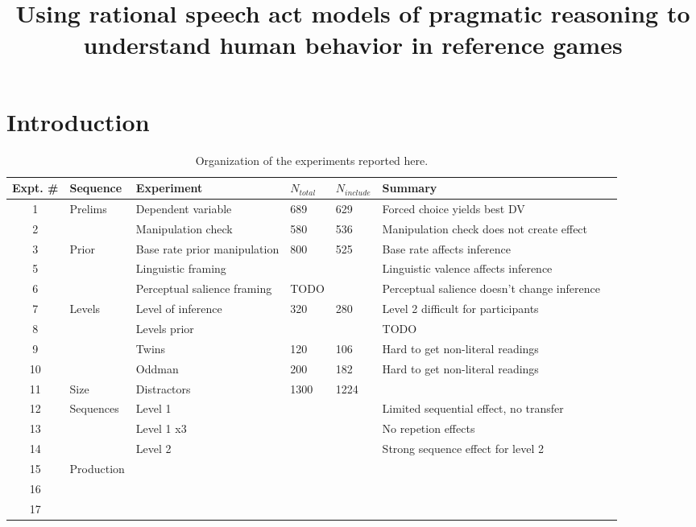 \documentclass[man,noapacite]{apa2}
\title{\vspace{-16ex}Using rational speech act models of pragmatic reasoning to understand human behavior in reference games}
\begin{document}
\maketitle                            


\section{Introduction}







\begin{table}[ht!]
\caption{Organization of the experiments reported here.}
\begin{tabular}{cllllll}
\hline
Expt. \# & Sequence & Experiment & $N_{total}$ & $N_{include}$ & Summary \\
\hline
1 & Prelims & Dependent variable & 689 & 629 & Forced choice yields best DV \\
2 & & Manipulation check & 580 & 536 & Manipulation check does not create effect \\
3 & Prior & Base rate prior manipulation & 800 & 525 & Base rate affects inference \\
5 &  & Linguistic framing & & & Linguistic valence affects inference\\
6 &  & Perceptual salience framing & TODO & & Perceptual salience doesn't change inference\\
7 & Levels & Level of inference & 320 & 280 & Level 2 difficult for participants \\
8 &    & Levels prior &  &  & TODO \\
9 &    & Twins & 120 & 106  & Hard to get non-literal readings\\
10 &    & Oddman & 200 & 182  & Hard to get non-literal readings\\
11 & Size  & Distractors & 1300 & 1224  & \\
12 & Sequences & Level 1 & & & Limited sequential effect, no transfer \\
13 & & Level 1 x3 & & & No repetion effects \\
14 & & Level 2 & & & Strong sequence effect for level 2 \\
15 & Production & & & & \\
16 & & & & & \\
17 & & & & & \\


\hline
\end{tabular}
\end{table}
\end{document}
